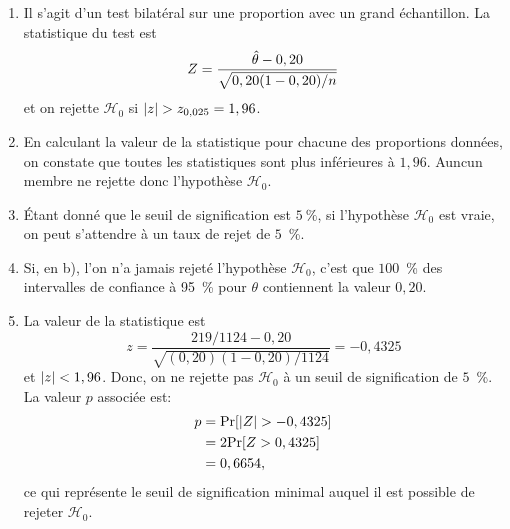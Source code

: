 \begin{solution}{6.9}
    \begin{enumerate}
    \item Il s'agit d'un test bilatéral sur une proportion avec un grand
      échantillon. La statistique du test est
      \begin{displaymath}
        Z = \frac{\hat{\theta} - 0,20}{%
          \sqrt{0,20 (1 - 0,20)/n}}
      \end{displaymath}
      et on rejette $ \mathcal{H}_0$ si $\lvert z \rvert > z_{0,025} = 1,96$.
    \item En calculant la valeur de la statistique pour chacune des
      proportions données, on constate que toutes les statistiques
      sont plus inférieures à $1,96$. Auncun membre ne rejette donc
      l'hypothèse $ \mathcal{H}_0$.
    \item Étant donné que le seuil de signification est $5~\%$, si
      l'hypothèse $ \mathcal{H}_0$ est vraie, on peut s'attendre à un taux de
      rejet de $5$~\%.
    \item Si, en b), l'on n'a jamais rejeté l'hypothèse $ \mathcal{H}_0$, c'est
      que $100$~\% des intervalles de confiance à 95~\% pour $\theta$
      contiennent la valeur $0,20$.
    \item La valeur de la statistique est
      \begin{equation*}
        z = \frac{219/1124 - 0,20}{\sqrt{(0,20)(1 - 0,20)/1124}}
        = -0,4325
      \end{equation*}
      et $\lvert z \rvert < 1,96$. Donc, on ne rejette pas $ \mathcal{H}_0$ à un seuil de
      signification de $5$~\%. La valeur $p$ associée est:
      \begin{align*}
        p &= \mathrm{Pr} [ \lvert Z \rvert > -0,4325 ]\\
        &= 2 \mathrm{Pr} [ Z > 0,4325 ]\\
        &= 0,6654,
      \end{align*}
      ce qui représente le seuil de signification minimal auquel il
      est possible de rejeter $ \mathcal{H}_0$. %
    \end{enumerate}
  
\end{solution}
